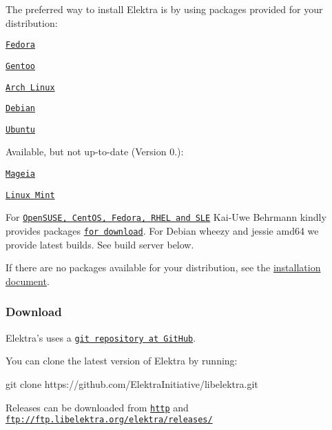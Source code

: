 The preferred way to install Elektra is by using packages provided for your distribution\+:
\begin{DoxyItemize}
\item \href{https://admin.fedoraproject.org/pkgdb/package/elektra/}{\tt Fedora}
\item \href{http://packages.gentoo.org/package/app-admin/elektra}{\tt Gentoo}
\item \href{https://aur.archlinux.org/packages/elektra/}{\tt Arch Linux}
\item \href{https://packages.debian.org/de/jessie/libelektra4}{\tt Debian}
\item \href{https://launchpad.net/ubuntu/+source/elektra}{\tt Ubuntu}
\end{DoxyItemize}

Available, but not up-\/to-\/date (Version 0.)\+:
\begin{DoxyItemize}
\item \href{http://svnweb.mageia.org/packages/updates/1/elektra/}{\tt Mageia}
\item \href{http://community.linuxmint.com/software/view/elektra}{\tt Linux Mint}
\end{DoxyItemize}

For \href{https://build.opensuse.org/package/show/home:bekun:devel/elektra}{\tt Open\+S\+U\+S\+E, Cent\+O\+S, Fedora, R\+H\+E\+L and S\+L\+E} Kai-\/\+Uwe Behrmann kindly provides packages \href{http://software.opensuse.org/download.html?project=home%3Abekun%3Adevel&package=libelektra4}{\tt for download}. For Debian wheezy and jessie amd64 we provide latest builds. See build server below.

If there are no packages available for your distribution, see the \hyperlink{doc_INSTALL_md}{installation document}.

\subsubsection*{Download}

Elektra's uses a \href{https://github.com/ElektraInitiative/libelektra}{\tt git repository at Git\+Hub}.

You can clone the latest version of Elektra by running\+: \begin{DoxyVerb}     git clone https://github.com/ElektraInitiative/libelektra.git
\end{DoxyVerb}


Releases can be downloaded from \href{http://www.libelektra.org/ftp/elektra/releases/}{\tt http} and {\ttfamily \href{ftp://ftp.libelektra.org/elektra/releases/}{\tt ftp\+://ftp.\+libelektra.\+org/elektra/releases/}}

